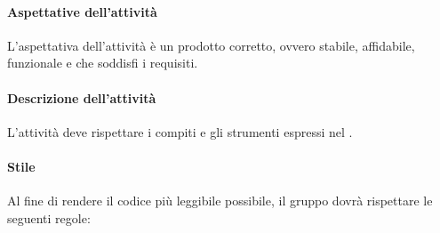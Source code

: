  \paragraph{Aspettative dell'attività}
 L'aspettativa dell'attività è un prodotto corretto, ovvero stabile, affidabile, funzionale e che soddisfi i requisiti.
 \paragraph{Descrizione dell'attività}
 L'attività deve rispettare i compiti e gli strumenti espressi nel \PPdocRP.
 \paragraph{Stile}

 Al fine di rendere il codice più leggibile possibile, il gruppo dovrà rispettare le seguenti regole:
